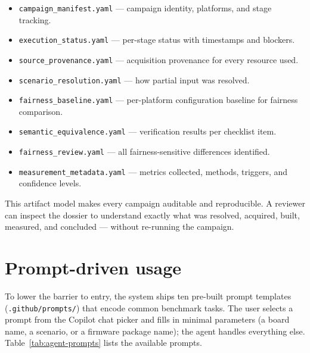 \begin{itemize}
\item \texttt{campaign\_manifest.yaml} --- campaign identity, platforms, and stage tracking.
\item \texttt{execution\_status.yaml} --- per-stage status with timestamps and blockers.
\item \texttt{source\_provenance.yaml} --- acquisition provenance for every resource used.
\item \texttt{scenario\_resolution.yaml} --- how partial input was resolved.
\item \texttt{fairness\_baseline.yaml} --- per-platform configuration baseline for fairness comparison.
\item \texttt{semantic\_equivalence.yaml} --- verification results per checklist item.
\item \texttt{fairness\_review.yaml} --- all fairness-sensitive differences identified.
\item \texttt{measurement\_metadata.yaml} --- metrics collected, methods, triggers, and confidence levels.
\end{itemize}

This artifact model makes every campaign auditable and reproducible. A reviewer can inspect
the dossier to understand exactly what was resolved, acquired, built, measured, and
concluded --- without re-running the campaign.

\section{Prompt-driven usage}
\label{sec:agent-prompts}

To lower the barrier to entry, the system ships ten pre-built prompt templates
(\texttt{.github/prompts/}) that encode common benchmark tasks. The user selects a prompt
from the Copilot chat picker and fills in minimal parameters (a board name, a scenario, or
a firmware package name); the agent handles everything else. Table~\ref{tab:agent-prompts}
lists the available prompts.

